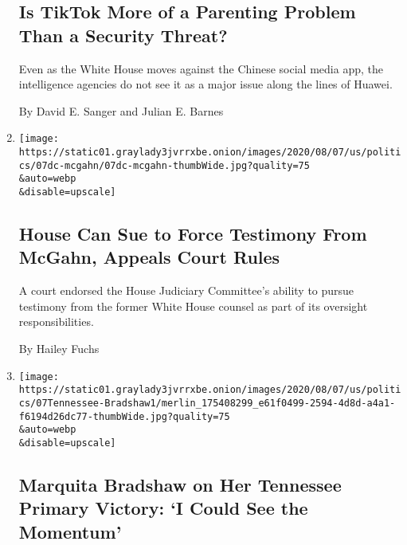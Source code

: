 \begin{enumerate}
  \hypertarget{is-tiktok-more-of-a-parenting-problem-than-a-security-threat-1}{%
  \subsection{Is TikTok More of a Parenting Problem Than a Security
  Threat?}\label{is-tiktok-more-of-a-parenting-problem-than-a-security-threat-1}}

  Even as the White House moves against the Chinese social media app,
  the intelligence agencies do not see it as a major issue along the
  lines of Huawei.

  By David E. Sanger and Julian E. Barnes
\item
  \href{/2020/08/07/us/politics/donald-mcgahn-congress-lawsuit.html}{}

  \texttt{[image: https://static01.graylady3jvrrxbe.onion/images/2020/08/07/us/politics/07dc-mcgahn/07dc-mcgahn-thumbWide.jpg?quality=75\\\&auto=webp\\\&disable=upscale]}

  \hypertarget{house-can-sue-to-force-testimony-from-mcgahn-appeals-court-rules}{%
  \subsection{House Can Sue to Force Testimony From McGahn, Appeals
  Court
  Rules}\label{house-can-sue-to-force-testimony-from-mcgahn-appeals-court-rules}}

  A court endorsed the House Judiciary Committee's ability to pursue
  testimony from the former White House counsel as part of its oversight
  responsibilities.

  By Hailey Fuchs
\item
  \href{/2020/08/07/us/politics/tennessee-election-marquita-bradshaw.html}{}

  \texttt{[image: https://static01.graylady3jvrrxbe.onion/images/2020/08/07/us/politics/07Tennessee-Bradshaw1/merlin\_175408299\_e61f0499-2594-4d8d-a4a1-f6194d26dc77-thumbWide.jpg?quality=75\\\&auto=webp\\\&disable=upscale]}

  \hypertarget{marquita-bradshaw-on-her-tennessee-primary-victory-i-could-see-the-momentum}{%
  \subsection{Marquita Bradshaw on Her Tennessee Primary Victory: `I
  Could See the
  Momentum'}\label{marquita-bradshaw-on-her-tennessee-primary-victory-i-could-see-the-momentum}}


\end{enumerate}
